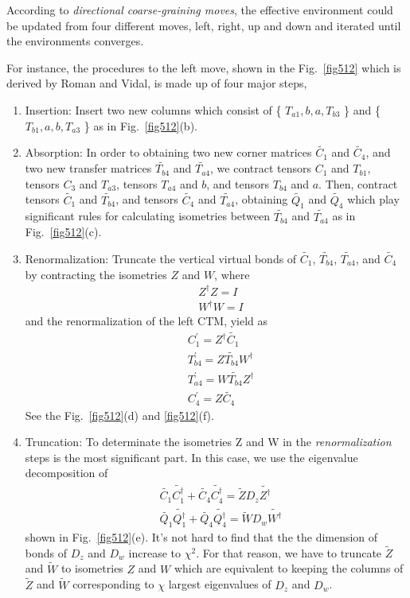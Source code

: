 According to \textit{directional coarse-graining moves}, the effective environment could be updated from four different moves, left, right, up and down and iterated until the environments converges. 

For instance, the procedures to the left move, shown in the Fig.~\ref{fig512} which is derived by Roman and Vidal, is made up of four major steps,
\begin{enumerate}
	\item Insertion: Insert two new columns which consist of \{ $T_{a1},b,a,T_{b3}$ \} and \{ $T_{b1},a,b,T_{a3}$ \} as in Fig.~\ref{fig512}(b).
	\item Absorption: In order to obtaining two new corner matrices $\tilde{C_1}$ and $\tilde{C_4}$, and two new transfer matrices $\tilde{T_{b4}}$ and $\tilde{T_{a4}}$, we contract tensors $C_1$ and $T_{b1}$, tensors $C_3$ and $T_{a3}$, tensors $T_{a4}$ and $b$, and tensors $T_{b4}$ and $a$. Then, contract tensors $\tilde{C_1}$ and $\tilde{T_{b4}}$, and tensors $\tilde{C_4}$ and $\tilde{T_{a4}}$, obtaining $\tilde{Q_1}$ and $\tilde{Q_4}$ which play significant rules for calculating isometries between $\tilde{T_{b4}}$ and $\tilde{T_{a4}}$ as in Fig.~\ref{fig512}(c).
	\item Renormalization: Truncate the vertical virtual bonds of $\widetilde{C_1}$, $\widetilde{T_{b4}}$, $\widetilde{T_{a4}}$, and $\widetilde{C_4}$ by contracting the isometries $Z$ and $W$, where
\begin{align}
	\label{isometry}
	&Z^{\dagger}Z = I \\
	&W^{\dagger}W = I
\end{align}
and the renormalization of the left CTM, yield as
\begin{align}
	\label{renormalize}
	&C^{\prime}_1 = Z^{\dagger} \tilde{C_1} \\
	&T_{b4}^{\prime} = Z\tilde{T_{b4}}W^{\dagger} \\
	&T_{a4}^{\prime} = W\tilde{T_{b4}}Z^{\dagger} \\
	&C^{\prime}_4 = Z\widetilde{C_4}
\end{align}
See the Fig.~\ref{fig512}(d) and \ref{fig512}(f).
	\item Truncation: To determinate the isometries Z and W in the \textit{renormalization} steps is the most significant part. In this case, we use the eigenvalue decomposition of 
		\begin{align}
			\label{eigh_ctm}
			&\tilde{C_1}\tilde{C^{\dagger}_1}+\tilde{C_4}\tilde{C^{\dagger}_4}= \tilde{Z} D_z \tilde{Z^{\dagger}}\\
			&\tilde{Q_1}\tilde{Q^{\dagger}_1}+\tilde{Q_4}\tilde{Q^{\dagger}_4}= \tilde{W} D_w \tilde{W^{\dagger}}
		\end{align}
		shown in Fig.~\ref{fig512}(e). It's not hard to find that the 
		the dimension of bonds of $D_z$ and $D_w$ increase to $\chi^2$. For that reason, we have to truncate $\tilde{Z}$ and $\tilde{W}$ to isometries $Z$ and $W$ which are equivalent to keeping the columns of $\tilde{Z}$ and $\tilde{W}$ corresponding to $\chi$ largest eigenvalues of $D_z$ and $D_w$.
\end{enumerate}

